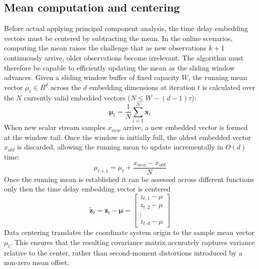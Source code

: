 \subsection{Mean computation and centering}
Before actual applying principal component analysis, the time delay embedding vectors must be centered by subtracting the mean. In the online scenarios, computing the mean raises the challenge that as new observations $k + 1$ continuously arrive, older observations become  irrelevant. The algorithm must therefore be capable to efficiently updating the mean as the sliding window advances.
Given a sliding window buffer of fixed capacity $W$, the running mean vector $\mu_t \in R^d$ across the $d$ embedding dimensions at iteration $t$ is calculated over the $N$ currently valid embedded vectors ($N \le W - (d - 1)\tau$):
\begin{equation}
    \boldsymbol{\mu}_t = \frac{1}{N} \sum_{i=1}^{N} \mathbf{x}_i
    \label{eq:tde_mean}
\end{equation}
When new scalar stream samples $x_{new}$ arrive, a new embedded vector is formed at the window tail. 
Once the window is initially full, the oldest embedded vector $x_{old}$ is discarded, allowing the running mean to update incrementally in $O(d)$ time:
\begin{equation}
\mu_{t+1} = \mu_t + \frac{x_{new} - x_{old}}{N}
\label{eq:mean_update}
\end{equation}
Once the running mean is established it can be assessed across different functions only then the time delay embedding vector is centered 
\begin{equation}
\tilde{\mathbf{z}}_t = \mathbf{z}_t - \boldsymbol{\mu} = 
\begin{bmatrix}
z_{t,1} - \mu \\
z_{t,2} - \mu \\
\vdots \\
z_{t,d} - \mu
\end{bmatrix}
\label{eq:centering_vector}
\end{equation}
Data centering translates the coordinate system origin to the sample mean vector $\mu_t$. This ensures that the resulting covariance matrix accurately captures variance relative to the center, rather than second-moment distortions introduced by a non-zero mean offset.